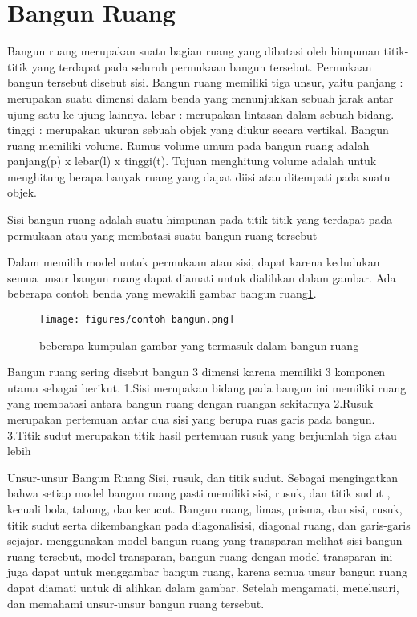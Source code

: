 	
\section{Bangun Ruang}
Bangun ruang merupakan suatu bagian ruang yang dibatasi oleh himpunan titik-titik yang terdapat pada seluruh permukaan bangun tersebut. 
Permukaan bangun tersebut disebut sisi. Bangun ruang memiliki tiga unsur, yaitu 
panjang : merupakan suatu dimensi dalam benda yang menunjukkan sebuah jarak antar ujung satu ke ujung lainnya.
lebar   : merupakan lintasan dalam sebuah bidang.
tinggi  : merupakan ukuran sebuah objek yang diukur secara vertikal.
Bangun ruang memiliki volume. Rumus volume umum pada bangun ruang adalah panjang(p) x lebar(l) x tinggi(t).
Tujuan menghitung volume adalah untuk menghitung berapa banyak ruang yang dapat diisi atau ditempati pada suatu objek.

Sisi bangun ruang adalah suatu himpunan pada titik-titik yang terdapat pada permukaan atau yang membatasi suatu bangun ruang tersebut \cite{umami2013eksperimentasi}

Dalam memilih model untuk permukaan atau sisi, dapat karena kedudukan semua unsur bangun ruang dapat diamati untuk dialihkan dalam gambar\cite{suharjana2008mengenal}. 
Ada beberapa contoh benda yang mewakili gambar bangun ruang\ref{contoh bangun}.
\begin{figure}[ht]
    \centerline{\texttt{[image: figures/contoh bangun.png]}}
    \caption{beberapa kumpulan gambar yang termasuk dalam bangun ruang}
    \label{contoh bangun}
    \end{figure}
 
Bangun ruang sering  disebut bangun 3 dimensi karena memiliki 3 komponen utama sebagai berikut.
1.Sisi  merupakan bidang pada bangun ini memiliki ruang yang membatasi antara bangun ruang dengan ruangan sekitarnya 
2.Rusuk merupakan pertemuan antar dua sisi yang berupa ruas garis pada bangun.
3.Titik sudut merupakan titik hasil pertemuan rusuk yang berjumlah tiga atau lebih

Unsur-unsur Bangun Ruang Sisi, rusuk, dan titik sudut. Sebagai mengingatkan bahwa setiap model bangun ruang pasti memiliki sisi, rusuk, dan titik sudut , kecuali bola, tabung, dan kerucut.
Bangun ruang, limas, prisma, dan sisi, rusuk, titik sudut serta dikembangkan pada diagonalisisi, diagonal ruang, dan garis-garis sejajar.
menggunakan model bangun ruang yang transparan  melihat sisi bangun ruang tersebut, model transparan, bangun ruang dengan model transparan ini juga dapat untuk menggambar bangun ruang, karena semua unsur bangun ruang dapat diamati untuk di alihkan dalam gambar. Setelah mengamati, 
menelusuri, dan memahami unsur-unsur bangun ruang tersebut.

